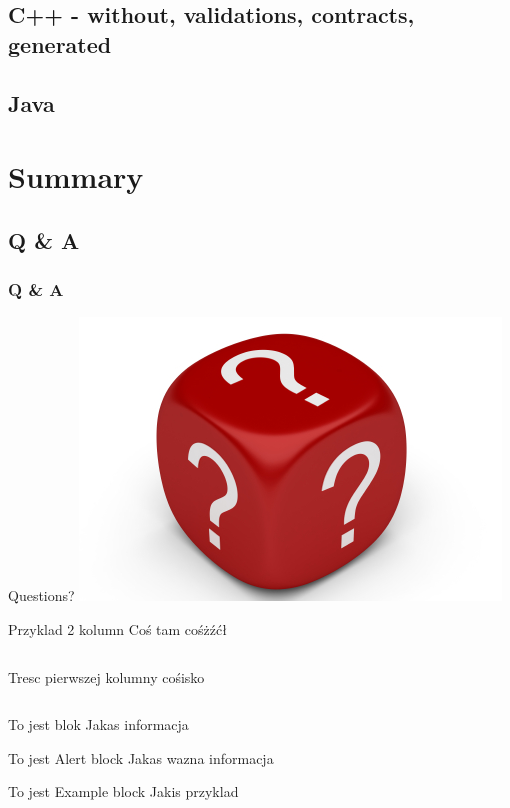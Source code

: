 \documentclass{beamer}
\begin{document}
\subsection{C++ - without, validations, contracts, generated}
\subsection{Java}

\section{Summary}
\subsection{Q \& A}
\begin{frame}
\frametitle{Q \& A}
\begin{center}
\Huge Questions?
\includegraphics[scale=0.45]{dice_questions}
\end{center}
\end{frame}



\begin{frame}{Przyklad 2 kolumn}
Coś tam cośżźćł
\begin{columns}[t] %
Tresc pierwszej kolumny
cośisko
\end{columns}
\end{frame}

\begin{frame}
\begin{block}{To jest blok}
Jakas informacja
\end{block}

\begin{alertblock}{To jest Alert block}
Jakas wazna informacja
\end{alertblock}

\begin{exampleblock}{To jest Example block}
Jakis przyklad
\end{exampleblock}
\end{frame}
\end{document}
